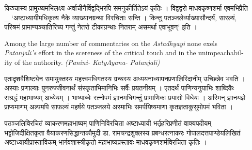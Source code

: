 किञ्चास्य प्रामुख्यमभिलक्ष्य अर्वाचीनैर्विद्वद्भिरपि समनुकीर्तितेऽयं कृतिः । विद्वद्वरो माधवकृष्णशर्मा एवमभिप्रैति _ ‘अष्टाध्यायीमधिकृत्य नैके व्याख्यानग्रन्था विरचिताः सन्ति । किन्तु पतञ्जलेर्व्याख्यासौन्दर्यं, सारल्यं, परिश्रमं प्रामाण्यञ्चातिरिच्य गन्तुं नेतरो टीकाग्रन्थाः नितराम् असमर्था एवाभूवन्’ इति ।

\begin{english}
Among the large number of commentaries on the \textit{Astadhyayi} none exels \textit{Patanjali’s} effort in the scereness of the critical touch and in the unimpeachability of the authority. \textit{(Panini- KatyAyana- Patanjali)}
\end{english}

एतादृशवैशिष्ट्येन समायुक्तस्य महत्त्वमधिगतस्य ग्रन्थस्य अध्ययनाध्यापनप्रणालिरिदानीम् उच्छिन्नेव भवति । अस्याः प्रणाल्याः पुनरुज्जीवनार्थं संस्कृताभिमानिभिः सर्वैः प्रयतनीयम् । एतदर्थं पाणिन्यनुयाभिः शाब्दिकैः सश्रद्धं महाभाष्यम् अध्येयम् । भाष्याब्धेः रत्नोपमं ज्ञानमधिगन्तुं प्रामाणिकः प्रयासो विधेयः । अस्मिन् ज्ञानयज्ञे प्राप्यमाणम् अल्पमपि साफल्यं महर्षये पतञ्जलये अस्माभिः समर्पयिष्यमाणा कृतज्ञताकुसुमोपमं भविता ।
 
\begin{thebibliography}
 पतञ्जलिविरचितं व्याकरणमहाभाष्यम्
 पाणिनिविरचिता अष्टाध्यायी
 भर्तृहरिप्रणीतं वाक्यपदीयम्
 भट्टोजिदीक्षितकृता वैयाकरणसिद्धान्तकौमुदी
 डा. रामचन्द्रशुक्लस्य प्रबन्धरत्नाकरः
 गोपालदत्तपाण्डेयलिखितं अष्टाध्यायीप्रास्ताविकम्
 भार्गवशास्त्रीकृतो महाभाष्यप्रस्तावः
 माधवकृष्णशर्मविरचिता  कृतिः ।
\end{thebibliography}
